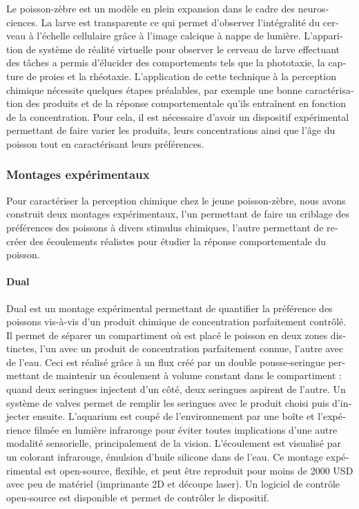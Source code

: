 \begin{otherlanguage}{french}
Le poisson-zèbre est un modèle en plein expansion dans le cadre des neurosciences. La larve est transparente ce qui permet d'observer l'intégralité du cerveau à l'échelle cellulaire grâce à l'image calcique à nappe de lumière. L'apparition de système de réalité virtuelle pour observer le cerveau de larve effectuant des tâches a permis d'élucider des comportements tels que la phototaxie, la capture de proies et la rhéotaxie. L'application de cette technique à la perception chimique nécessite quelques étapes préalables, par exemple une bonne caractérisation des produits et de la réponse comportementale qu'ils entraînent en fonction de la concentration. Pour cela, il est nécessaire d'avoir un dispositif expérimental permettant de faire varier les produits, leurs concentrations ainsi que l'âge du poisson tout en caractérisant leurs préférences.

\subsubsection*{Montages expérimentaux}
Pour caractériser la perception chimique chez le jeune poisson-zèbre, nous avons construit deux montages expérimentaux, l'un permettant de faire un criblage des préférences des poissons à divers stimulus chimiques, l'autre permettant de recréer des écoulements réalistes pour étudier la réponse comportementale du poisson.

\paragraph{Dual} Dual est un montage expérimental permettant de quantifier la préférence des poissons vis-à-vis d'un produit chimique de concentration parfaitement contrôlé. Il permet de séparer un compartiment où est placé le poisson en deux zones distinctes, l'un avec un produit de concentration parfaitement connue, l'autre avec de l'eau. Ceci est réalisé grâce à un flux créé par un double pousse-seringue permettant de maintenir un écoulement à volume constant dans le compartiment : quand deux seringues injectent d'un côté, deux seringues aspirent de l'autre. Un système de valves permet de remplir les seringues avec le produit choisi puis d'injecter ensuite. L'aquarium est coupé de l'environnement par une boîte et l'expérience filmée en lumière infrarouge pour éviter toutes implications d'une autre modalité sensorielle, principalement de la vision. L'écoulement est visualisé par un colorant infrarouge, émulsion d'huile silicone dans de l'eau. Ce montage expérimental est open-source, flexible, et peut être reproduit pour moins de 2000 USD avec peu de matériel (imprimante 2D et découpe laser). Un logiciel de contrôle open-source est disponible et permet de contrôler le dispositif.


\end{otherlanguage}
